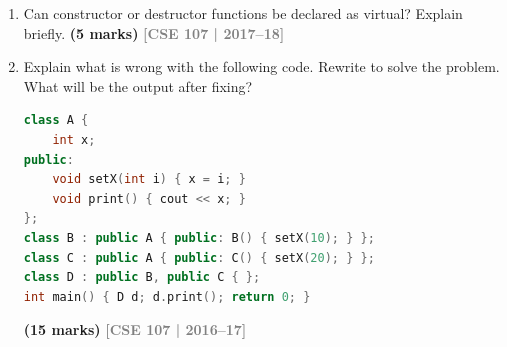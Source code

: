\documentclass[12pt,a3paper]{article}
\newcommand{\yr}[1]{\hfill\textcolor{gray}{\small\textbf{[#1]}}}
\newcommand{\mk}[1]{\textcolor{orange!70!black}{\small\textbf{(#1 marks)}}}
\begin{document}
\begin{enumerate}
\begin{tcolorbox}
\textbf{Virtual Base Class:}
A base class declared with \texttt{virtual} in the inheritance
specifier.  It ensures that when a class appears multiple times in a
hierarchy (diamond), only \textbf{one shared instance} of that base
is included in the most-derived class.

\textbf{When needed:} Whenever the same base class is inherited by
two or more intermediate classes that are themselves combined in a
derived class (diamond problem).

\textbf{Example:}
\begin{lstlisting}[language=C++]
#include <iostream>
using namespace std;

class Vehicle {
public:
    int speed;
    Vehicle(int s=0): speed(s){}
    void show(){ cout<<"Speed: "<<speed<<"\n"; }
};

class Car    : virtual public Vehicle {};
class Boat   : virtual public Vehicle {};
class Amphibian : public Car, public Boat {
public:
    Amphibian(int s): Vehicle(s){}  // initialises the ONE shared Vehicle
};

int main(){
    Amphibian a(120);
    a.speed = 80;    // no ambiguity
    a.show();        // Speed: 80
}
\end{lstlisting}

Without \texttt{virtual}, \texttt{Amphibian} would have
\texttt{Car::Vehicle} and \texttt{Boat::Vehicle} as two separate
subobjects; \texttt{a.speed} would be ambiguous.

\end{tcolorbox}


\item Can constructor or destructor functions be declared as virtual? Explain briefly. \mk{5}
\yr{CSE 107 | 2017--18}

\item Explain what is wrong with the following code. Rewrite to solve the problem. What will be the output after fixing?
\begin{lstlisting}[language=C++]
class A {
    int x;
public:
    void setX(int i) { x = i; }
    void print() { cout << x; }
};
class B : public A { public: B() { setX(10); } };
class C : public A { public: C() { setX(20); } };
class D : public B, public C { };
int main() { D d; d.print(); return 0; }
\end{lstlisting}
\mk{15}
\yr{CSE 107 | 2016--17}

\begin{tcolorbox}[enhanced,breakable,ansbox,colback=cG!4,colframe=cG,
  boxrule=0.8pt,arc=5pt,
  title={\textbf{Answer --- Fix diamond ambiguity in class D; output after fix}},
  fonttitle=\bfseries\color{white},colbacktitle=cG]


\end{tcolorbox}
\end{enumerate}
\end{document}
